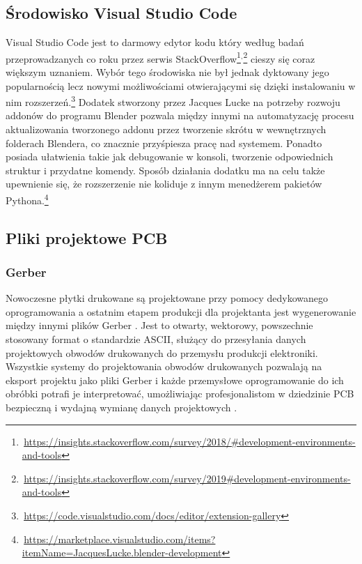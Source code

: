 \documentclass{xmgr}
\begin{document}
\subsection{Środowisko Visual Studio Code}
Visual Studio Code jest to darmowy edytor kodu który według badań przeprowadzanych co roku przez serwis StackOverflow\footnote{\,\url{https://insights.stackoverflow.com/survey/2018/\#development-environments-and-tools}}$^{,}$\footnote{\,\url{https://insights.stackoverflow.com/survey/2019\#development-environments-and-tools}} cieszy się coraz większym uznaniem. Wybór tego środowiska nie był jednak dyktowany jego popularnością lecz nowymi możliwościami otwierającymi się dzięki instalowaniu w nim rozszerzeń.\footnote{\,\url{https://code.visualstudio.com/docs/editor/extension-gallery}} Dodatek stworzony przez Jacques Lucke na potrzeby rozwoju addonów do programu Blender pozwala między innymi na automatyzację procesu aktualizowania tworzonego addonu przez tworzenie skrótu w wewnętrznych folderach Blendera, co znacznie przyśpiesza pracę nad systemem. Ponadto posiada ułatwienia takie jak debugowanie w konsoli, tworzenie odpowiednich struktur i przydatne komendy. Sposób działania dodatku ma na celu także upewnienie się, że rozszerzenie nie koliduje z innym menedżerem pakietów Pythona.\footnote{\,\url{https://marketplace.visualstudio.com/items?itemName=JacquesLucke.blender-development}} 

\subsection{Pliki projektowe PCB}

\subsubsection {Gerber}
Nowoczesne płytki drukowane są projektowane przy pomocy dedykowanego oprogramowania a ostatnim etapem produkcji dla projektanta jest wygenerowanie między innymi plików Gerber \cite{Khandpur}.
Jest to otwarty, wektorowy, powszechnie stosowany format o standardzie ASCII, służący do przesyłania danych projektowych obwodów drukowanych do przemysłu produkcji elektroniki. Wszystkie systemy do projektowania obwodów drukowanych pozwalają na eksport projektu jako pliki Gerber i każde przemysłowe oprogramowanie do ich obróbki potrafi je interpretować, umożliwiając profesjonalistom w dziedzinie PCB bezpieczną i wydajną wymianę danych projektowych \cite{Williams}.
\end{document}

